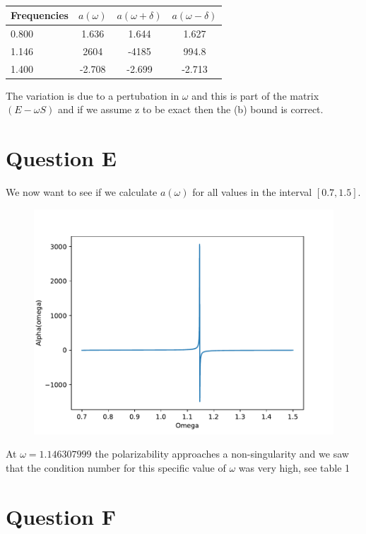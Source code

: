 \documentclass[a4paper,12pkt]{report}
\begin{document}
\begin{table}[h!]
    \centering
    \begin{tabular}{l  c  c  c }
    \hline
     Frequencies & $a(\omega)$ & $a(\omega+\delta)$ & $a(\omega-\delta)$ \\ \hline
     0.800 & 1.636 & 1.644 & 1.627\\
     1.146 & 2604 & -4185 & 994.8\\
     1.400 & -2.708 & -2.699 & -2.713
    \end{tabular}
    \caption{}
\end{table}

The variation is due to a pertubation in $\omega$ and this is part of the matrix $(E-\omega S)$ and if we assume z to be exact then the (b) bound is correct.

\section*{Question E}

We now want to see if we calculate $a(\omega)$ for all values in the interval $[0.7,1.5]$.

\begin{figure}[h]
    \includegraphics[width = 12cm]{e1.pdf}
    \centering
\end{figure}

\noindent
At $\omega = 1.146307999$ the polarizability approaches a non-singularity and we saw that the condition number for this specific value of $\omega$ was very high, see table 1


\section*{Question F}
\end{document}
